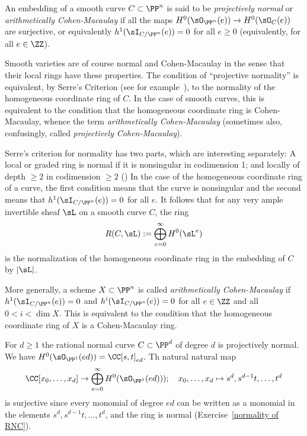  
\begin{definition} An embedding of a smooth curve
$C\subset \PP^n$ is said to be \emph{projectively normal} or \emph{arithmetically Cohen-Macaulay} if all the maps $H^0(\sO_{\PP^n}(e)) \to H^0(\sO_C(e))$ are surjective,
or equivalently $h^1(\sI_{C/\PP^n}(e))=0$ for all $e\geq 0$ (equivalently, for all $e\in \ZZ$). 
\end{definition}
 
 
\begin{remark}
 Smooth varieties are of course normal and Cohen-Macaulay in the sense that their local rings have these properties. The condition of ``projective normality'' is equivalent, by Serre's Criterion (see for example~\cite[Section 11.2]{Eisenbud1995}), to the normality of the homogeneous coordinate ring of $C$. In the case of smooth curves, this is equivalent to the condition that the homogeneous coordinate
ring is Cohen-Macaulay, whence the term \emph{arithmetically Cohen-Macaulay} (sometimes also, confusingly, called
\emph{projectively Cohen-Macaulay}).


Serre's criterion for normality has two parts, which are interesting separately: A local or graded ring is normal if it is nonsingular in
codimension 1; and
locally of depth $\geq 2$ in codimension $\geq 2$ (\cite[Theorem 11.5]{Eisenbud1995}) In the case of the homogeneous coordinate ring of a curve, 
the first condition means that the curve is nonsingular and the second means that $h^1(\sI_{C/\PP^n}(e))=0$ for all $e$.
It follows that for any very ample invertible sheaf $\sL$ on a smooth curve $C$, the ring 
$$
R(C, \sL) := \bigoplus_{e=0}^\infty H^0(\sL^e)
$$
is the normalization of the homogeneous coordinate ring in the embedding of $C$ by $|\sL|$.

More generally, a scheme
$X\subset \PP^n$ is called \emph{arithmetically Cohen-Macaulay} if 
$h^1(\sI_{C/\PP^n}(e))=0$ and $h^i(\sI_{C/\PP^n}(e))=0$ for all $e\in \ZZ$ and all $0<i<\dim X$.
This is equivalent to the condition that the homogeneous coordinate ring of $X$ is a Cohen-Macaulay
ring.

\end{remark}

\begin{example}\label{rnc is projectively normal}
For $d\geq 1$ the rational normal curve $C\subset \PP^d$ of degree $d$ is projectively normal. 
We have $H^0(\sO_{\PP^1}(ed))  = \CC[s,t]_{ed}$. Th natural natural map
$$
\CC[x_0,\dots,x_d] \to\bigoplus_{e = 0}^\infty H^0(\sO_{\PP^1}(ed)));\quad x_0,\dots, x_d \mapsto s^d,s^{d-1}t,\dots, t^d
$$ 
is surjective since every monomial of degree $ed$ can be written as a monomial in  
the elements $s^d,s^{d-1}t,\dots, t^d$, and the ring is normal (Exercise~\ref{normality of RNC}).
\end{example}


